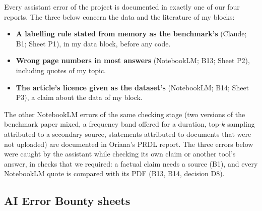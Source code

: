 Every assistant error of the project is documented in exactly one of our four reports. The three below
concern the data and the literature of my blocks:
\begin{itemize}[leftmargin=1.2em,itemsep=2pt]
  \item \textbf{A labelling rule stated from memory as the benchmark's} (Claude; B1; Sheet P1), in my data
        block, before any code.
  \item \textbf{Wrong page numbers in most answers} (NotebookLM; B13; Sheet P2), including quotes of my
        topic.
  \item \textbf{The article's licence given as the dataset's} (NotebookLM; B14; Sheet P3), a claim about the
        data of my block.
\end{itemize}
The other NotebookLM errors of the same checking stage (two versions of the benchmark paper mixed, a
frequency band offered for a duration, top-$k$ sampling attributed to a secondary source, statements
attributed to documents that were not uploaded) are documented in Oriana's PRDL report. The three errors
below were caught by the assistant while checking its own claim or another tool's answer, in checks that
we required: a factual claim needs a source (B1), and every NotebookLM quote is compared with its PDF
(B13, B14, decision D8).

\subsection*{AI Error Bounty sheets}

